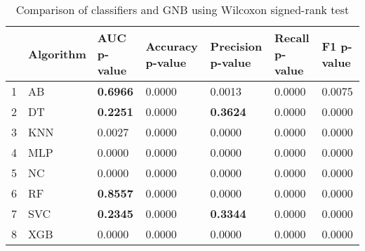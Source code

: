 \begin{table}
\footnotesize
\caption{Comparison of classifiers and GNB using Wilcoxon signed-rank test}
\label{tab:wilcoxon comparison}
\begin{tabular}{lllllll}
\hline
 & Algorithm & AUC p-value & Accuracy p-value & Precision p-value & Recall p-value & F1 p-value \\
\hline
1 & AB & \textbf{0.6966} & 0.0000 & 0.0013 & 0.0000 & 0.0075 \\
2 & DT & \textbf{0.2251} & 0.0000 & \textbf{0.3624} & 0.0000 & 0.0000 \\
3 & KNN & 0.0027 & 0.0000 & 0.0000 & 0.0000 & 0.0000 \\
4 & MLP & 0.0000 & 0.0000 & 0.0000 & 0.0000 & 0.0000 \\
5 & NC & 0.0000 & 0.0000 & 0.0000 & 0.0000 & 0.0000 \\
6 & RF & \textbf{0.8557} & 0.0000 & 0.0000 & 0.0000 & 0.0000 \\
7 & SVC & \textbf{0.2345} & 0.0000 & \textbf{0.3344} & 0.0000 & 0.0000 \\
8 & XGB & 0.0000 & 0.0000 & 0.0000 & 0.0000 & 0.0000 \\
\hline
\end{tabular}
\end{table}
